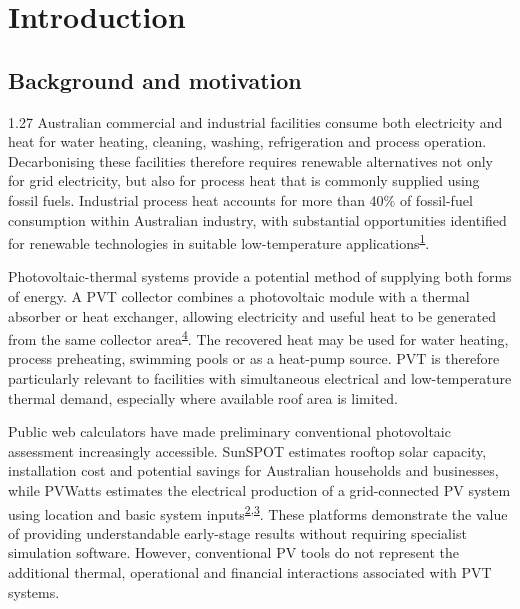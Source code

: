 \documentclass[12pt,letterpaper]{article}
\newcommand{\done}{\ \textcolor{green!45!black}{$\checkmark$}} %
\DeclareRobustCommand{\citenum}[1]{\hyperlink{ref:#1}{#1}} %
\begin{document}
\label{sec:frontmatterend}

\clearpage

\setcounter{page}{1}
\setcounter{section}{0}
\label{sec:bodystart}

\section{Introduction}\label{sec1}

\subsection[Background and motivation\done]{Background and motivation}\label{sec2}

\begin{spacing}{1.27}
Australian commercial and industrial facilities consume both electricity and heat for water heating, cleaning, washing, refrigeration and process operation. Decarbonising these facilities therefore requires renewable alternatives not only for grid electricity, but also for process heat that is commonly supplied using fossil fuels. Industrial process heat accounts for more than 40\% of fossil-fuel consumption within Australian industry, with substantial opportunities identified for renewable technologies in suitable low-temperature applications\textsuperscript{\citenum{1}}.\par

\vspace{0.15in}

Photovoltaic-thermal systems provide a potential method of supplying both forms of energy. A PVT collector combines a photovoltaic module with a thermal absorber or heat exchanger, allowing electricity and useful heat to be generated from the same collector area\textsuperscript{\citenum{4}}. The recovered heat may be used for water heating, process preheating, swimming pools or as a heat-pump source. PVT is therefore particularly relevant to facilities with simultaneous electrical and low-temperature thermal demand, especially where available roof area is limited.\par

\vspace{0.15in}

Public web calculators have made preliminary conventional photovoltaic assessment increasingly accessible. SunSPOT estimates rooftop solar capacity, installation cost and potential savings for Australian households and businesses, while PVWatts estimates the electrical production of a grid-connected PV system using location and basic system inputs\textsuperscript{\citenum{2},\citenum{3}}. These platforms demonstrate the value of providing understandable early-stage results without requiring specialist simulation software. However, conventional PV tools do not represent the additional thermal, operational and financial interactions associated with PVT systems.\par


\end{spacing}
\end{document}
